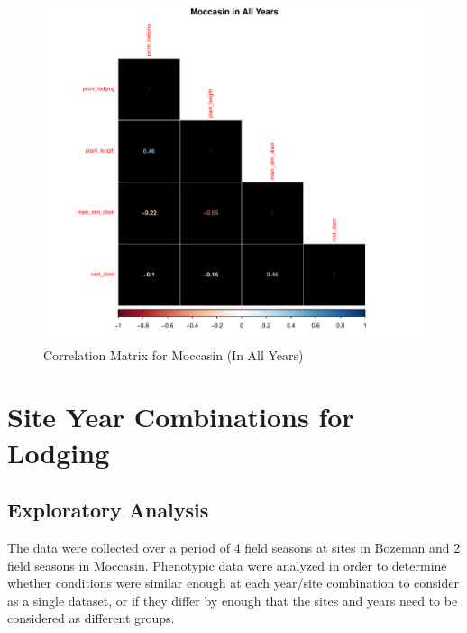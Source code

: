 \documentclass[11pt]{article}\usepackage[]{graphicx}\usepackage[]{color}
\makeatletter
\def\maxwidth{ %
  \ifdim\Gin@nat@width>\linewidth
    \linewidth
  \else
    \Gin@nat@width
  \fi
}
\newenvironment{knitrout}{}{} %
\makeatother
\begin{document}
\begin{knitrout}\footnotesize
{}\color{fgcolor}\begin{figure}[H]

{\centering \includegraphics[width=\maxwidth]{figure/MocAllYear-1} 

}

\caption[Correlation Matrix for Moccasin (In All Years)]{Correlation Matrix for Moccasin (In All Years)}\label{fig:MocAllYear}
\end{figure}


\end{knitrout}
\pagebreak

\section{Site Year Combinations for Lodging}




\subsection{Exploratory Analysis} 
The data were collected over a period of 4 field seasons at sites in Bozeman and 2 field seasons in Moccasin. Phenotypic data were analyzed in order to determine whether conditions were similar enough at each year/site combination to consider as a single dataset, or if they differ by enough that the sites and years need to be considered as different groups.  
\end{document}
